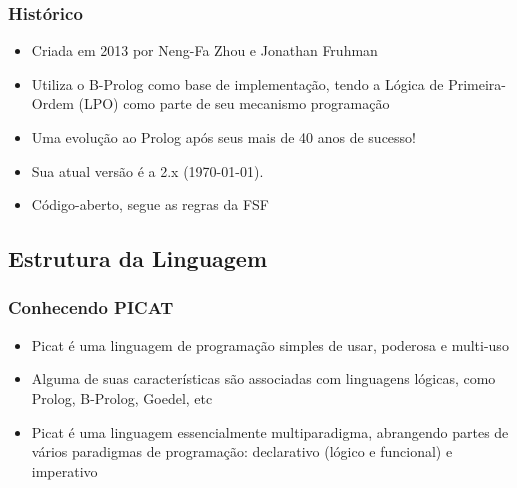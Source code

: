 \begin{frame}

    \frametitle{Histórico}

    \begin{itemize}
      \item Criada em 2013 por Neng-Fa Zhou e Jonathan Fruhman

      \item Utiliza o B-Prolog como base de implementação, tendo
      a Lógica de Primeira-Ordem (LPO) como parte de seu mecanismo programação

\pause
      \item Uma evolução ao Prolog após seus mais de 40 anos de sucesso!

\pause
      \item Sua atual versão é a 2.x (\today).
\pause
      \item Código-aberto, segue as regras da FSF

    \end{itemize}
\end{frame}


\subsection{Estrutura da Linguagem}

\begin{frame}
	\frametitle{Conhecendo PICAT}
    
    \begin{itemize}
    
    	\item Picat é uma linguagem de programação simples de usar, poderosa e multi-uso
        
        \item Alguma de suas características 
         são associadas com linguagens lógicas, como Prolog, B-Prolog, Goedel, etc
        
        \pause
        \item Picat é uma linguagem essencialmente multiparadigma,
        abrangendo partes de vários paradigmas de programação: declarativo (lógico e funcional) e     imperativo
        
        
    \end{itemize}
    
\end{frame}

